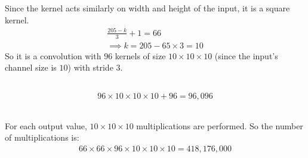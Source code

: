 \documentclass{article}
\numberwithin{equation}{section}
\begin{document}
\section{}
\subsection{}
Since the kernel acts similarly on width and height of the input, it is a square kernel.
\begin{align}
\frac{205 - k}{3} + 1 = 66 \\
\implies k = 205 - 65 \times 3 = 10
\end{align}
So it is a convolution with \(96\) kernels of size \(10 \times 10 \times 10\) (since the input's channel size is \(10\)) with stride \(3\).
\subsection{}
\begin{align}
96 \times 10 \times 10 \times 10 + 96 = 96,096
\end{align}
\subsection{}
For each output value, \(10 \times 10 \times 10\) multiplications are performed. So the number of multiplications is:
\begin{align}
66 \times 66 \times 96 \times 10 \times 10 \times 10 = 418,176,000
\end{align}
\end{document}
